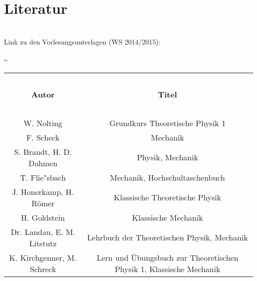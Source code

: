 


\section{Literatur}

~\\
Link zu den Vorlesungsunterlagen (WS 2014/2015):\\~\\

{\verb|~|}



\begin{longtable}[c]{c|c}
	
	  ~
	& ~
	  
	\\
	  
      \textbf{Autor}
	& \textbf{Titel}
	
	\\
	
	  ~
	& ~
	
	\\ \hline
	
	  W. Nolting
	& Grundkurs Theoretische Physik 1
	
	\\ \hline
	
	  F. Scheck
	& Mechanik
	
	\\ \hline
	
	  S. Brandt, H. D. Dahmen
	& Physik, Mechanik
	
	\\ \hline
	
	  T. Flie{"s}bach
	& Mechanik, Hochschultaschenbuch
	
	\\ \hline
	
	  J. Honerkamp, H. Römer
	& Klassische Theoretische Physik
	
	\\ \hline
	
	  H. Goldstein
	& Klassische Mechanik
	
	\\ \hline
	
      Dr. Landau, E. M. Litstutz
	& Lehrbuch der Theoretischen Physik, Mechanik
	
	\\ \hline
	
	  K. Kirchgenner, M. Schreck
	& Lern und Übungsbuch zur Theoretischen Physik 1, Klassische Mechanik
	
	\\ \hline
	
	
\end{longtable}


